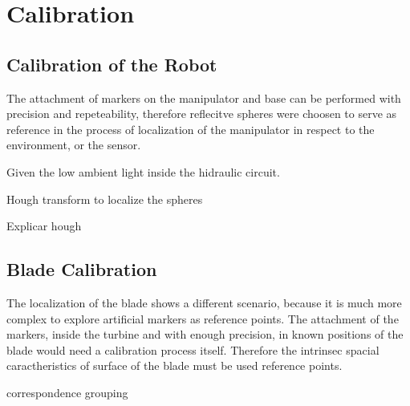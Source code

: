 \section{Calibration}


\subsection{Calibration of the Robot}

The attachment of markers on the manipulator and base can be performed with
precision and repeteability, therefore reflecitve spheres were choosen to serve
as reference in the process of localization of the manipulator in respect to the
environment, or the sensor.

Given the low ambient light inside the hidraulic circuit.

Hough transform to localize the spheres \cite{hough2014}

Explicar hough

\subsection{Blade Calibration}

The localization of the blade shows a different scenario, because it is much
more complex to explore artificial markers as reference points. The attachment
of the markers, inside the turbine and with enough precision,  in known
positions of the blade would need a calibration process itself. Therefore the
intrinsec spacial caractheristics of surface of the blade must be used 
reference points.

correspondence grouping \cite{Tombari2010a}
